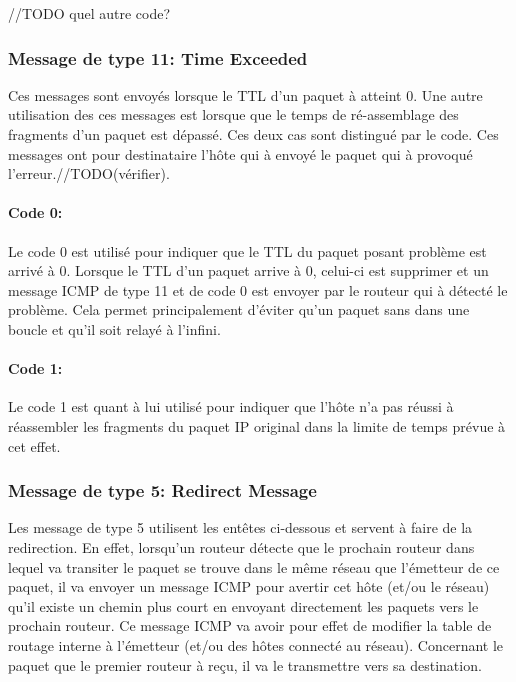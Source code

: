 //TODO quel autre code?



\subsubsection{Message de type 11: Time Exceeded}
Ces messages sont envoyés lorsque le TTL d'un paquet à atteint 0. Une autre
utilisation des ces messages est lorsque que le temps de ré-assemblage des
fragments d'un paquet est dépassé. Ces deux cas sont distingué par le code. Ces
messages ont pour destinataire l'hôte qui à envoyé le paquet qui à provoqué
l'erreur.//TODO(vérifier).

\paragraph{Code 0:}
Le code 0 est utilisé pour indiquer que le TTL du paquet posant problème est arrivé à 0.
Lorsque le TTL d'un paquet arrive à 0, celui-ci est supprimer et un message
ICMP de type 11 et de code 0 est envoyer par le routeur qui à détecté le
problème. Cela permet principalement d'éviter qu'un paquet sans dans une boucle
et qu'il soit relayé à l'infini.

\paragraph{Code 1:} Le code 1 est quant à lui utilisé pour indiquer que l'hôte n'a pas
réussi à réassembler les fragments du paquet IP original dans la limite de temps prévue
à cet effet.


\subsubsection{Message de type 5: Redirect Message} Les message de type 5 utilisent les entêtes
ci-dessous et servent à faire de la redirection. En effet, lorsqu'un routeur
détecte que le prochain routeur dans lequel va transiter le paquet se trouve
dans le même réseau que l'émetteur de ce paquet, il va envoyer un message ICMP
pour avertir cet hôte (et/ou le réseau) qu'il existe un chemin plus court en
envoyant directement les paquets vers le prochain routeur. Ce message ICMP va
avoir pour effet de modifier la table de routage interne à l'émetteur (et/ou
des hôtes connecté au réseau). Concernant le paquet que le premier routeur à
reçu, il va le transmettre vers sa destination.


